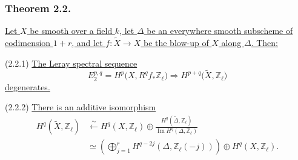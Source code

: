 \subsubsection*{Theorem 2.2.}
\underline{Let $X$ be smooth over a field $k$, let $\Delta$ be an everywhere
smooth subscheme of codimension $1+r$, and let
$f:\widetilde X\longrightarrow X$ be the blow-up of $X$ along $\Delta$.
Then:}

\medskip
\noindent(2.2.1) \underline{The Leray spectral sequence}
\[
E_2^{p,q}=H^p\bigl(X,R^qf_*\mathbb Z_\ell\bigr)
\Longrightarrow
H^{p+q}\bigl(\widetilde X,\mathbb Z_\ell\bigr)
\]
\underline{degenerates.}

\medskip
\noindent(2.2.2) \underline{There is an additive isomorphism}
\[
\begin{aligned}
H^q(\widetilde X,\mathbb Z_\ell)
&\xleftarrow{\ \sim\ }
H^q(X,\mathbb Z_\ell)\oplus
\frac{H^q(\widetilde\Delta,\mathbb Z_\ell)}
     {\operatorname{Im}H^q(\Delta,\mathbb Z_\ell)}
\\
&\simeq
\left(\bigoplus_{j=1}^{r}
H^{q-2j}(\Delta,\mathbb Z_\ell(-j))\right)
\oplus H^q(X,\mathbb Z_\ell).
\end{aligned}
\]

